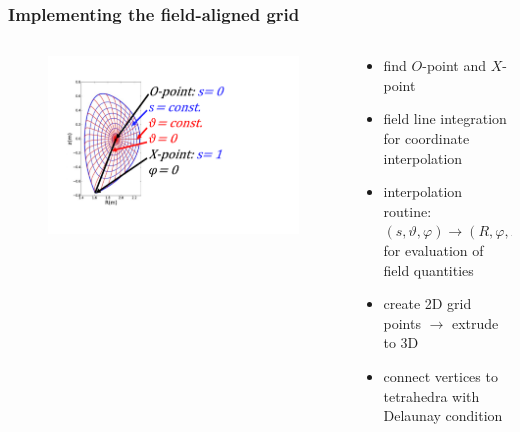 \documentclass{beamer}
\begin{document}
\begin{frame}
\frametitle{Implementing the field-aligned grid}
\vspace{-0 cm}
\begin{columns}[onlytextwidth]
	\begin{column}{0.5\textwidth}
			\vspace{-1 cm}
		\begin{center}
			\begin{figure}
				\includegraphics[trim={2cm 3cm 6cm 2cm},clip,width=1.1\textwidth]{FIGURES/SFC_pdf2.pdf}
			\end{figure}
		\end{center}
	\end{column}
	\begin{column}{0.5\textwidth}
		\vspace{-1.5 cm}
		\begin{center}
			\begin{itemize}
				\item find $O$-point and $X$-point
				\item field line integration for coordinate interpolation
				\item interpolation routine: $(s,\vartheta,\varphi)\rightarrow (R,\varphi,Z)$ for evaluation of field quantities
				\item create 2D grid points \newline $\rightarrow$ extrude to 3D
				\item connect vertices to tetrahedra with Delaunay condition
			\end{itemize}
		\end{center}
	\end{column}
\end{columns}
\end{frame}
\end{document}

